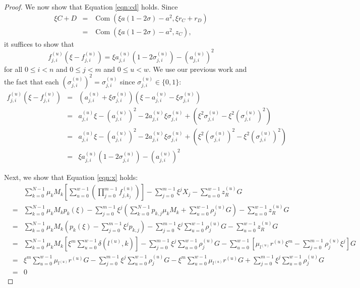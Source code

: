\documentclass{article}
\newcommand{\com}{\operatorname{Com}}
\newcommand{\sumj}{\sum_{j=0}^{m-1}}
\newcommand{\sumk}{\sum_{k=0}^{N-1}}
\newcommand{\sumu}{\sum_{u=0}^{w-1}}
\theoremstyle{definition}
\begin{document}
\begin{proof}
We now show that Equation \ref{eqn:cd} holds.
Since
\begin{eqnarray*}
\xi C + D &=& \com(\xi a(1 - 2\sigma) - a^2,\xi r_C + r_D) \\
&=& \com(\xi a(1 - 2\sigma) - a^2,z_C),
\end{eqnarray*}
it suffices to show that $$f_{j,i}^{(u)}\left( \xi - f_{j,i}^{(u)} \right) = \xi a_{j,i}^{(u)}\left( 1 - 2\sigma_{j,i}^{(u)} \right) - \left(a_{j,i}^{(u)}\right)^2$$ for all $0 \leq i < n$ and $0 \leq j < m$ and $0 \leq u < w$.
We use our previous work and the fact that each $\left(\sigma_{j,i}^{(u)}\right)^2 = \sigma_{j,i}^{(u)}$ since $\sigma_{j,i}^{(u)} \in \{0,1\}$:
\begin{eqnarray*}
f_{j,i}^{(u)}\left( \xi - f_{j,i}^{(u)} \right) &=& \left( a_{j,i}^{(u)} + \xi\sigma_{j,i}^{(u)} \right)\left( \xi - a_{j,i}^{(u)} - \xi\sigma_{j,i}^{(u)} \right) \\
&=& a_{j,i}^{(u)}\xi - \left(a_{j,i}^{(u)}\right)^2 - 2a_{j,i}^{(u)}\xi\sigma_{j,i}^{(u)} + \left( \xi^2\sigma_{j,i}^{(u)} - \xi^2\left(\sigma_{j,i}^{(u)}\right)^2 \right) \\
&=& a_{j,i}^{(u)}\xi - \left(a_{j,i}^{(u)}\right)^2 - 2a_{j,i}^{(u)}\xi\sigma_{j,i}^{(u)} + \left( \xi^2\left(\sigma_{j,i}^{(u)}\right)^2 - \xi^2\left(\sigma_{j,i}^{(u)}\right)^2 \right) \\
&=& \xi a_{j,i}^{(u)}\left( 1 - 2\sigma_{j,i}^{(u)} \right) - \left(a_{j,i}^{(u)}\right)^2
\end{eqnarray*}

Next, we show that Equation \ref{eqn:x} holds:
\begin{eqnarray*}
&& \sumk \mu_kM_k \left[ \sumu \left( \prod_{j=0}^{m-1} f^{(u)}_{j,k_j} \right) \right] - \sumj \xi^jX_j - \sumu z^{(u)}_RG \\
&=& \sumk \mu_kM_k p_k(\xi) - \sumj \xi^j \left( \sumk p_{k,j}\mu_kM_k + \sumu \rho^{(u)}_jG \right) - \sumu z^{(u)}_RG \\
&=& \sumk \mu_kM_k \left( p_k(\xi) - \sumj \xi^j p_{k,j} \right) - \sumj \xi^j \sumu \rho^{(u)}_jG - \sumu z^{(u)}_RG \\
&=& \sumk \mu_kM_k \left[ \xi^m \sumu \delta\left( l^{(u)},k \right) \right] - \sumj \xi^j \sumu \rho^{(u)}_jG - \sumu\left[ \mu_{l^{(u)}}r^{(u)}\xi^m - \sumj \rho^{(u)}_j\xi^j \right]G \\
&=& \xi^m\sumu \mu_{l^{(u)}}r^{(u)}G - \sumj \xi^j \sumu \rho^{(u)}_jG - \xi^m\sumu \mu_{l^{(u)}}r^{(u)}G + \sumj \xi^j \sumu \rho^{(u)}_jG \\
&=& 0
\end{eqnarray*}


\end{proof}
\end{document}
